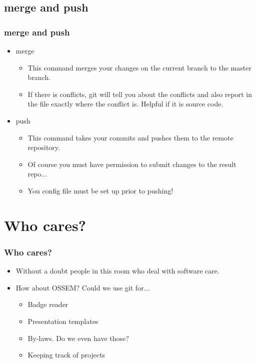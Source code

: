 \documentclass{beamer}
\begin{document}
\subsection{merge and push}
\begin{frame}
    \frametitle{merge and push}
    \begin{itemize}
        \item{merge}
        \begin{itemize}
            \item{This command merges your changes on the current branch to the master branch.}
            \item{If there is conflicts, git will tell you about the conflicts and also report in the file exactly where the conflict is. Helpful if it is source code.}
        \end{itemize}

        \item{push}
        \begin{itemize}
            \item{This command takes your commits and pushes them to the remote repository.}
            \item{Of course you must have permission to submit changes to the result repo...}
            \item{You config file must be set up prior to pushing!}
        \end{itemize}

    \end{itemize}
\end{frame}

\section{Who cares?}
\begin{frame}
    \frametitle{Who cares?}
    \begin{itemize}
        \item{Without a doubt people in this room who deal with software care.}
        \item{How about OSSEM? Could we use git for...}
            \begin{itemize}
                \item{Badge reader}
                \item{Presentation templates}
                \item{By-laws. Do we even have those?}
                \item{Keeping track of projects}
            \end{itemize}
    \end{itemize}
\end{frame}
\end{document}
